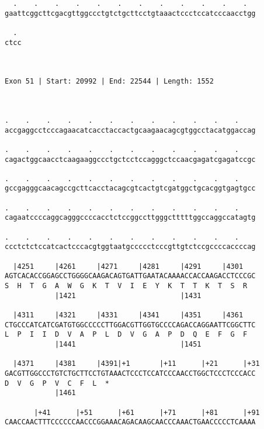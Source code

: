 \documentclass{article}
\begin{document}
\begin{Verbatim}
  .    .    .    .    .    .    .    .    .    .    .    .  
gaattcggcttcgacgttggccctgtctgcttcctgtaaactccctccatcccaacctgg
                                                            
  . 
ctcc
    
    
 
Exon 51 | Start: 20992 | End: 22544 | Length: 1552



.    .    .    .    .    .    .    .    .    .    .    .    
accgaggcctcccagaacatcacctaccactgcaagaacagcgtggcctacatggaccag
                                                            
.    .    .    .    .    .    .    .    .    .    .    .    
cagactggcaacctcaagaaggccctgctcctccagggctccaacgagatcgagatccgc
                                                            
.    .    .    .    .    .    .    .    .    .    .    .    
gccgagggcaacagccgcttcacctacagcgtcactgtcgatggctgcacggtgagtgcc
                                                            
.    .    .    .    .    .    .    .    .    .    .    .    
cagaatccccaggcagggccccacctctccggccttgggctttttggccaggccatagtg
                                                            
.    .    .    .    .    .    .    .    .    .    .    .    
ccctctctccatcactcccacgtggtaatgccccctcccgttgtctccgccccaccccag
                                                            
  |4251     |4261     |4271     |4281     |4291     |4301   
AGTCACACCGGAGCCTGGGGCAAGACAGTGATTGAATACAAAACCACCAAGACCTCCCGC
S  H  T  G  A  W  G  K  T  V  I  E  Y  K  T  T  K  T  S  R  
            |1421                         |1431             
  
  |4311     |4321     |4331     |4341     |4351     |4361   
CTGCCCATCATCGATGTGGCCCCCTTGGACGTTGGTGCCCCAGACCAGGAATTCGGCTTC
L  P  I  I  D  V  A  P  L  D  V  G  A  P  D  Q  E  F  G  F  
            |1441                         |1451             
  
  |4371     |4381     |4391|+1       |+11      |+21      |+31
GACGTTGGCCCTGTCTGCTTCCTGTAAACTCCCTCCATCCCAACCTGGCTCCCTCCCACC
D  V  G  P  V  C  F  L  *   
            |1461                                           
  
       |+41      |+51      |+61      |+71      |+81      |+91
CAACCAACTTTCCCCCCAACCCGGAAACAGACAAGCAACCCAAACTGAACCCCCTCAAAA
                                                            

\end{Verbatim}
\end{document}
